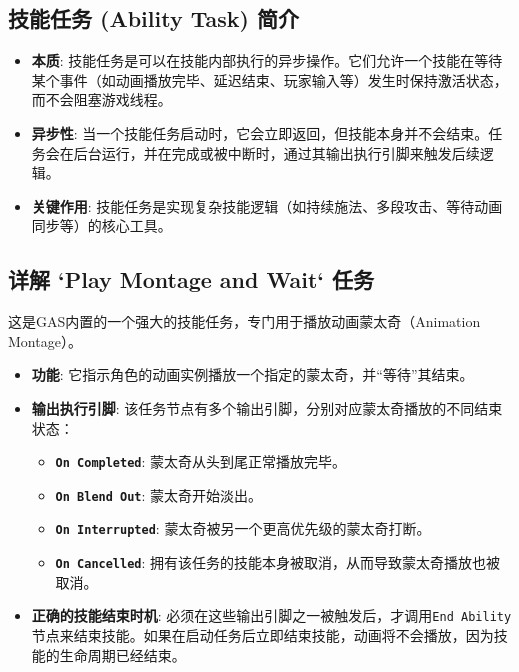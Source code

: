 \documentclass[10pt,CJKmath]{zhbook-v1}
\begin{document}
\subsection{技能任务 (Ability Task) 简介}
\begin{itemize}
    \item \textbf{本质}: 技能任务是可以在技能内部执行的异步操作。它们允许一个技能在等待某个事件（如动画播放完毕、延迟结束、玩家输入等）发生时保持激活状态，而不会阻塞游戏线程。
    \item \textbf{异步性}: 当一个技能任务启动时，它会立即返回，但技能本身并不会结束。任务会在后台运行，并在完成或被中断时，通过其输出执行引脚来触发后续逻辑。
    \item \textbf{关键作用}: 技能任务是实现复杂技能逻辑（如持续施法、多段攻击、等待动画同步等）的核心工具。
\end{itemize}

\subsection{详解 `Play Montage and Wait` 任务}
这是GAS内置的一个强大的技能任务，专门用于播放动画蒙太奇（Animation Montage）。
\begin{itemize}
    \item \textbf{功能}: 它指示角色的动画实例播放一个指定的蒙太奇，并“等待”其结束。
    \item \textbf{输出执行引脚}: 该任务节点有多个输出引脚，分别对应蒙太奇播放的不同结束状态：
    \begin{itemize}
        \item \textbf{\texttt{On Completed}}: 蒙太奇从头到尾正常播放完毕。
        \item \textbf{\texttt{On Blend Out}}: 蒙太奇开始淡出。
        \item \textbf{\texttt{On Interrupted}}: 蒙太奇被另一个更高优先级的蒙太奇打断。
        \item \textbf{\texttt{On Cancelled}}: 拥有该任务的技能本身被取消，从而导致蒙太奇播放也被取消。
    \end{itemize}
    \item \textbf{正确的技能结束时机}: 必须在这些输出引脚之一被触发后，才调用\texttt{End Ability}节点来结束技能。如果在启动任务后立即结束技能，动画将不会播放，因为技能的生命周期已经结束。
\end{itemize}
\end{document}

